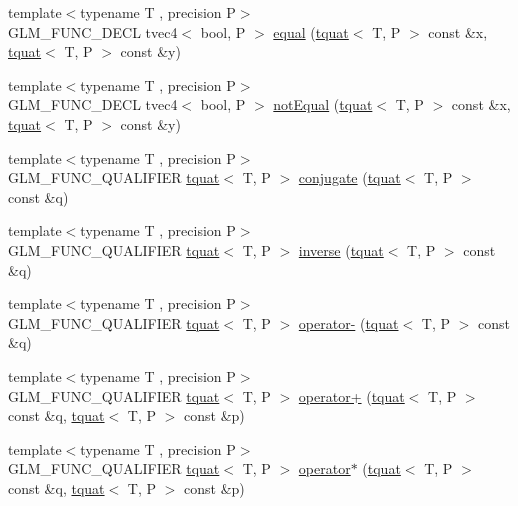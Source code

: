 \begin{DoxyCompactItemize}
\item 
{\footnotesize template$<$typename T , precision P$>$ }\\G\+L\+M\+\_\+\+F\+U\+N\+C\+\_\+\+D\+E\+C\+L tvec4$<$ bool, P $>$ \hyperlink{group__gtc__quaternion_gac187115710365e0b2902220b9611e7b6}{equal} (\hyperlink{structglm_1_1tquat}{tquat}$<$ T, P $>$ const \&x, \hyperlink{structglm_1_1tquat}{tquat}$<$ T, P $>$ const \&y)
\item 
{\footnotesize template$<$typename T , precision P$>$ }\\G\+L\+M\+\_\+\+F\+U\+N\+C\+\_\+\+D\+E\+C\+L tvec4$<$ bool, P $>$ \hyperlink{group__gtc__quaternion_ga484c4633f7c05d8e29ee8b452350f539}{not\+Equal} (\hyperlink{structglm_1_1tquat}{tquat}$<$ T, P $>$ const \&x, \hyperlink{structglm_1_1tquat}{tquat}$<$ T, P $>$ const \&y)
\item 
{\footnotesize template$<$typename T , precision P$>$ }\\G\+L\+M\+\_\+\+F\+U\+N\+C\+\_\+\+Q\+U\+A\+L\+I\+F\+I\+E\+R \hyperlink{structglm_1_1tquat}{tquat}$<$ T, P $>$ \hyperlink{group__gtc__quaternion_gab1ace864fbf189ffa368950001808a3c}{conjugate} (\hyperlink{structglm_1_1tquat}{tquat}$<$ T, P $>$ const \&q)
\item 
{\footnotesize template$<$typename T , precision P$>$ }\\G\+L\+M\+\_\+\+F\+U\+N\+C\+\_\+\+Q\+U\+A\+L\+I\+F\+I\+E\+R \hyperlink{structglm_1_1tquat}{tquat}$<$ T, P $>$ \hyperlink{group__gtc__quaternion_ga5f47300c024c2d809944e6ac661d6d14}{inverse} (\hyperlink{structglm_1_1tquat}{tquat}$<$ T, P $>$ const \&q)
\item 
{\footnotesize template$<$typename T , precision P$>$ }\\G\+L\+M\+\_\+\+F\+U\+N\+C\+\_\+\+Q\+U\+A\+L\+I\+F\+I\+E\+R \hyperlink{structglm_1_1tquat}{tquat}$<$ T, P $>$ \hyperlink{group__gtc__quaternion_ga64cdb5fcebb192579798cfe79670239f}{operator-\/} (\hyperlink{structglm_1_1tquat}{tquat}$<$ T, P $>$ const \&q)
\item 
{\footnotesize template$<$typename T , precision P$>$ }\\G\+L\+M\+\_\+\+F\+U\+N\+C\+\_\+\+Q\+U\+A\+L\+I\+F\+I\+E\+R \hyperlink{structglm_1_1tquat}{tquat}$<$ T, P $>$ \hyperlink{group__gtc__quaternion_ga517657374d8ca180d63c33ff9430518a}{operator+} (\hyperlink{structglm_1_1tquat}{tquat}$<$ T, P $>$ const \&q, \hyperlink{structglm_1_1tquat}{tquat}$<$ T, P $>$ const \&p)
\item 
{\footnotesize template$<$typename T , precision P$>$ }\\G\+L\+M\+\_\+\+F\+U\+N\+C\+\_\+\+Q\+U\+A\+L\+I\+F\+I\+E\+R \hyperlink{structglm_1_1tquat}{tquat}$<$ T, P $>$ \hyperlink{group__gtc__quaternion_gabca7455f687e322b505531e15786d845}{operator$\ast$} (\hyperlink{structglm_1_1tquat}{tquat}$<$ T, P $>$ const \&q, \hyperlink{structglm_1_1tquat}{tquat}$<$ T, P $>$ const \&p)

\end{DoxyCompactItemize}
